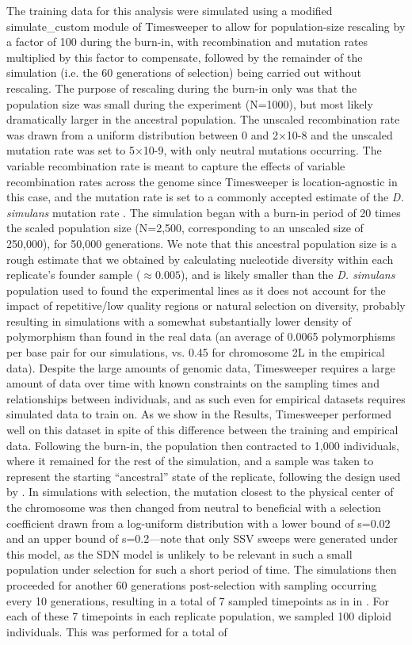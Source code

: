 The training data for this analysis were simulated using a modified simulate\_custom module of Timesweeper to allow for population-size rescaling by a factor of 100 during the burn-in, with recombination and mutation rates multiplied by this factor to compensate, followed by the remainder of the simulation (i.e. the 60 generations of selection) being carried out without rescaling. The purpose of rescaling during the burn-in only was that the population size was small during the experiment (N=1000), but most likely dramatically larger in the ancestral population. The unscaled recombination rate was drawn from a uniform distribution between 0 and 2×10-8 and the unscaled mutation rate was set to 5×10-9, with only neutral mutations occurring. The variable recombination rate is meant to capture the effects of variable recombination rates across the genome since Timesweeper is location-agnostic in this case, and the mutation rate is set to a commonly accepted estimate of the \textit{D. simulans} mutation rate \cite{barghiGeneticRedundancyFuels2019}. The simulation began with a burn-in period of 20 times the scaled population size (N=2,500, corresponding to an unscaled size of 250,000), for 50,000 generations. We note that this ancestral population size is a rough estimate that we obtained by calculating nucleotide diversity within each replicate’s founder sample ($\approx 0.005$), and is likely smaller than the \textit{D. simulans} population used to found the experimental lines as it does not account for the impact of repetitive/low quality regions or natural selection on diversity, probably resulting in simulations with a somewhat substantially lower density of polymorphism than found in the real data (an average of 0.0065 polymorphisms per base pair for our simulations, vs. 0.45 for chromosome 2L in the empirical data). Despite the large amounts of  genomic data, Timesweeper requires a large amount of data over time with known constraints on the sampling times and relationships between individuals, and as such even for empirical datasets requires simulated data to train on. As we show in the Results, Timesweeper performed well on this dataset in spite of this difference between the training and empirical data. Following the burn-in, the population then contracted to 1,000 individuals, where it remained for the rest of the simulation, and a sample was taken to represent the starting “ancestral” state of the replicate, following the design used by \cite{barghiGeneticRedundancyFuels2019}. In simulations with selection, the mutation closest to the physical center of the chromosome was then changed from neutral to beneficial with a selection coefficient drawn from a log-uniform distribution with a lower bound of s=0.02 and an upper bound of s=0.2—note that only SSV sweeps were generated under this model, as the SDN model is unlikely to be relevant in such a small population under selection for such a short period of time. The simulations then proceeded for another 60 generations post-selection with sampling occurring every 10 generations, resulting in a total of 7 sampled timepoints as in in \cite{barghiGeneticRedundancyFuels2019}. For each of these 7 timepoints in each replicate population, we sampled 100 diploid individuals. This was performed for a total of 